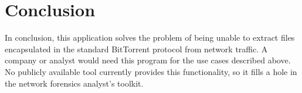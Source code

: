 \documentclass{acm_proc_article-sp}
\begin{document}
\section{Conclusion}
In conclusion, this application solves the problem of being unable to extract
files encapsulated in the standard BitTorrent protocol from network traffic.  A
company or analyst would need this program for the use cases described above.
No publicly available tool currently provides this functionality, so it fills a
hole in the network forensics analyst's toolkit.

\nocite{*}


\end{document}
